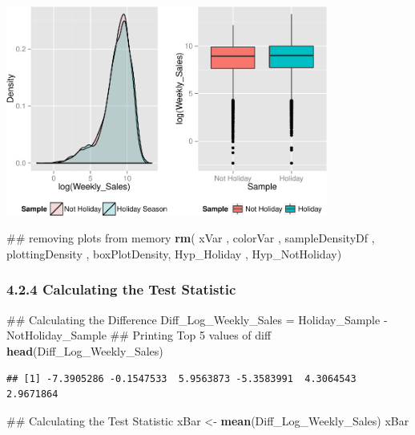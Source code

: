 \documentclass[]{article}
\newenvironment{Shaded}{\begin{snugshade}}{\end{snugshade}}
\newcommand{\KeywordTok}[1]{\textcolor[rgb]{0.13,0.29,0.53}{\textbf{{#1}}}}
\newcommand{\StringTok}[1]{\textcolor[rgb]{0.31,0.60,0.02}{{#1}}}
\newcommand{\NormalTok}[1]{{#1}}
\begin{document}
\includegraphics[width=400px]{PredictingWeeklySalesAtWalmart_files/figure-latex/visualizingTheSamplesCollected2-1}

\begin{Shaded}
\begin{Highlighting}[]
\NormalTok{## removing plots from memory}
\KeywordTok{rm}\NormalTok{( xVar , colorVar , sampleDensityDf , plottingDensity , }
    \NormalTok{boxPlotDensity, Hyp_Holiday , Hyp_NotHoliday)}
\end{Highlighting}
\end{Shaded}

\subsubsection{4.2.4 Calculating the Test
Statistic}\label{calculating-the-test-statistic-1}

\begin{Shaded}
\begin{Highlighting}[]
\NormalTok{## Calculating the Difference}
\NormalTok{Diff_Log_Weekly_Sales =}\StringTok{ }\NormalTok{Holiday_Sample -}\StringTok{ }\NormalTok{NotHoliday_Sample}
\NormalTok{## Printing Top 5 values of diff}
\KeywordTok{head}\NormalTok{(Diff_Log_Weekly_Sales)}
\end{Highlighting}
\end{Shaded}

\begin{verbatim}
## [1] -7.3905286 -0.1547533  5.9563873 -5.3583991  4.3064543  2.9671864
\end{verbatim}

\begin{Shaded}
\begin{Highlighting}[]
\NormalTok{## Calculating the Test Statistic}
\NormalTok{xBar <-}\StringTok{ }\KeywordTok{mean}\NormalTok{(Diff_Log_Weekly_Sales)}
\NormalTok{xBar}
\end{Highlighting}
\end{Shaded}
\end{document}
